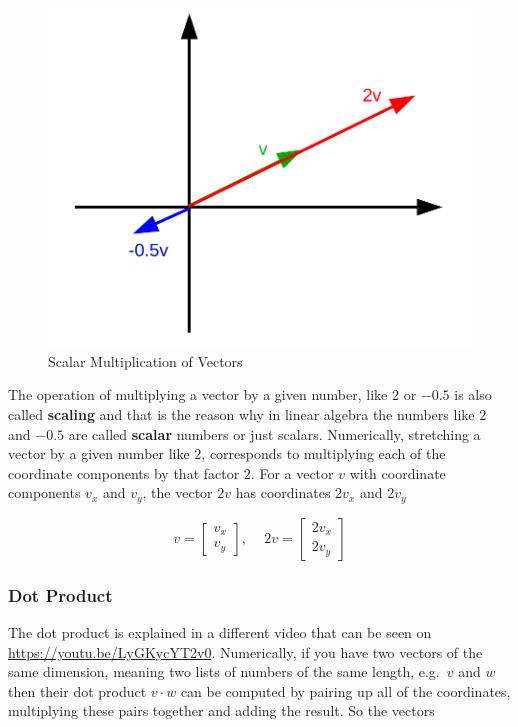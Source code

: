\documentclass[
]{book}
\begin{document}
\begin{figure}[!ht]
\includegraphics[width=1\linewidth,]{odg/vector-scalar-multiplication} \caption{Scalar Multiplication of Vectors}\label{fig:vector-scalar-multiplication}
\end{figure}

The operation of multiplying a vector by a given number, like \(2\) or \(-0.5\) is also called \textbf{scaling} and that is the reason why in linear algebra the numbers like \(2\) and \(-0.5\) are called \textbf{scalar} numbers or just scalars. Numerically, stretching a vector by a given number like \(2\), corresponds to multiplying each of the coordinate components by that factor \(2\). For a vector \(v\) with coordinate components \(v_x\) and \(v_y\), the vector \(2v\) has coordinates \(2v_x\) and \(2v_y\)

\[v = \left[\begin{array}{c} v_x \\ v_y \end{array}\right] \text{, }\quad 2v = \left[\begin{array}{c} 2v_x \\ 2v_y \end{array}\right]\]

\hypertarget{intro-linalg-dot-product}{%
\subsubsection{Dot Product}\label{intro-linalg-dot-product}}

The dot product is explained in a different video that can be seen on \url{https://youtu.be/LyGKycYT2v0}. Numerically, if you have two vectors of the same dimension, meaning two lists of numbers of the same length, e.g.~\(v\) and \(w\) then their dot product \(v \cdot w\) can be computed by pairing up all of the coordinates, multiplying these pairs together and adding the result. So the vectors
\end{document}

